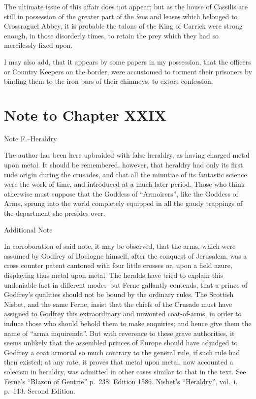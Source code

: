 The ultimate issue of this affair does not appear; but as the house of
Cassilis are still in possession of the greater part of the feus and
leases which belonged to Crossraguel Abbey, it is probable the talons of
the King of Carrick were strong enough, in those disorderly times, to
retain the prey which they had so mercilessly fixed upon.

I may also add, that it appears by some papers in my possession, that
the officers or Country Keepers on the border, were accustomed to
torment their prisoners by binding them to the iron bars of their
chimneys, to extort confession.

\section*{Note to Chapter XXIX}\label{noteCXXIX}

Note F.--Heraldry

The author has been here upbraided with false heraldry, as having
charged metal upon metal. It should be remembered, however, that
heraldry had only its first rude origin during the crusades, and that
all the minutiae of its fantastic science were the work of time, and
introduced at a much later period. Those who think otherwise must
suppose that the Goddess of ``Armoirers'', like the Goddess of Arms,
sprung into the world completely equipped in all the gaudy trappings of
the department she presides over.

\noindent Additional Note

In corroboration of said note, it may be observed, that the arms, which
were assumed by Godfrey of Boulogne himself, after the conquest of
Jerusalem, was a cross counter patent cantoned with four little crosses
or, upon a field azure, displaying thus metal upon metal. The heralds
have tried to explain this undeniable fact in different modes--but Ferne
gallantly contends, that a prince of Godfrey's qualities should not be
bound by the ordinary rules. The Scottish Nisbet, and the same Ferne,
insist that the chiefs of the Crusade must have assigned to Godfrey this
extraordinary and unwonted coat-of-arms, in order to induce those who
should behold them to make enquiries; and hence give them the name of
``arma inquirenda''. But with reverence to these grave authorities, it
seems unlikely that the assembled princes of Europe should have adjudged
to Godfrey a coat armorial so much contrary to the general rule, if such
rule had then existed; at any rate, it proves that metal upon metal, now
accounted a solecism in heraldry, was admitted in other cases similar to
that in the text. See Ferne's ``Blazon of Gentrie'' p.~238. Edition
1586. Nisbet's ``Heraldry'', vol.~i. p.~113. Second Edition.

